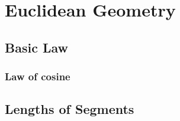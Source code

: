 \chapter{Euclidean Geometry}

\section{Basic Law}

\subsection{Law of cosine}



\section{Lengths of Segments}

